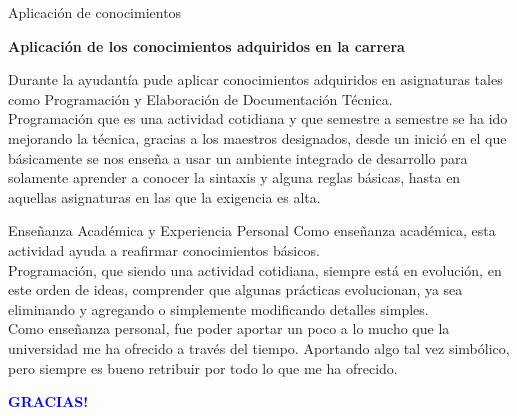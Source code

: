 \documentclass[12pt]{beamer}
\begin{document}
    \begin{frame}{Aplicación de conocimientos}
        \begin{center}
            \textbf{Aplicación de los conocimientos adquiridos  en la carrera}
        \end{center}
        \hspace{5mm}Durante la ayudantía pude aplicar conocimientos adquiridos en asignaturas tales como Programación y Elaboración de Documentación Técnica.\\              
        \hspace{5mm}Programación que es una actividad cotidiana y que semestre a semestre se ha ido mejorando la técnica, gracias a los maestros designados, desde un inició en el que básicamente se nos enseña a usar un ambiente integrado de desarrollo para solamente aprender a conocer la sintaxis y alguna reglas básicas, hasta en aquellas asignaturas en las que la exigencia es alta.
    \end{frame}


    \begin{frame}{Enseñanza Académica y Experiencia Personal}
        Como enseñanza académica, esta actividad ayuda a reafirmar conocimientos básicos.
        \\
        \hspace{5mm}Programación, que siendo una actividad cotidiana, siempre está en evolución, en este orden de ideas, comprender que algunas prácticas evolucionan, ya sea eliminando y agregando o simplemente modificando detalles simples.\\
        \hspace{5mm}Como enseñanza personal, fue poder aportar un poco a lo mucho que la universidad me ha ofrecido a través del tiempo. Aportando algo tal vez simbólico, pero siempre es bueno retribuir por todo lo que me ha ofrecido.
    \end{frame}
    
    \begin{frame}
        \begin{center}
            \textcolor{blue}{\Huge \textbf{GRACIAS!}}
        \end{center}
    \end{frame}
\end{document}
